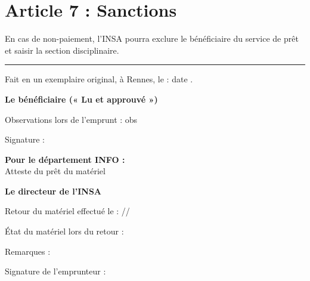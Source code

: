 \documentclass[12pt,a4paper]{article}
\begin{document}
\section*{Article 7 : Sanctions}

En cas de non-paiement, l’INSA pourra exclure le bénéficiaire du service de prêt et saisir la section disciplinaire.

\vspace{0.5cm}
\rule{\linewidth}{1pt}
\vspace{0.5cm}

Fait en un exemplaire original, à Rennes, le : {{ date }}.

\vspace{0.5cm}

\textbf{Le bénéficiaire (« Lu et approuvé »)} 

\vspace{0.4cm}

Observations lors de l’emprunt : {{ obs }}

\vspace{0.4cm}

Signature :

\vspace{0.3cm}

\begin{minipage}{0.5\linewidth} 
\end{minipage} 
\hfill 
\begin{minipage}{0.5\linewidth} 
\textbf{Pour le département INFO :} \\[0.3cm] 
Atteste du prêt du matériel \\[0.4cm] 
\begin{center} 
\textbf{Le directeur de l’INSA} \\ 
\end{center} 
\end{minipage}

\vspace{1.2cm}

Retour du matériel effectué le : \underline{\hspace{2cm}}/\underline{\hspace{2cm}}/\underline{\hspace{2cm}}

\vspace{0.5cm}

État du matériel lors du retour : \\

\vspace{0.25cm}

Remarques : \\

\vspace{0.4cm}

Signature de l’emprunteur :
\end{document}
